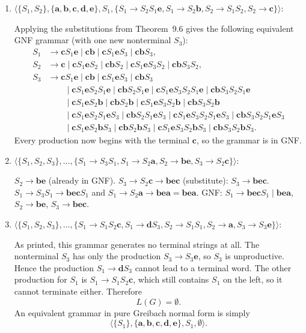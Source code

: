 \begin{enumerate}[{9.}1. ]
\begin{enumerate}
\item $\langle\{S_1,S_2\},\{\pmb{a},\pmb{b},\pmb{c},\pmb{d},\pmb{e}\},S_1,\{S_1\to S_2S_1\pmb{e},S_1\to S_2\pmb{b},S_2\to S_1S_2,S_2\to\pmb{c}\}\rangle$:

Applying the substitutions from Theorem~9.6 gives the following equivalent GNF
grammar (with one new nonterminal $S_3$):
\[
\begin{aligned}
S_1&\to \pmb{c}S_1\pmb{e}\mid \pmb{c}\pmb{b}\mid \pmb{c}S_1\pmb{e}S_3\mid \pmb{c}\pmb{b}S_3,\\
S_2&\to \pmb{c}\mid \pmb{c}S_1\pmb{e}S_2\mid \pmb{c}\pmb{b}S_2\mid
\pmb{c}S_1\pmb{e}S_3S_2\mid \pmb{c}\pmb{b}S_3S_2,\\
S_3&\to \pmb{c}S_1\pmb{e}\mid \pmb{c}\pmb{b}\mid \pmb{c}S_1\pmb{e}S_3\mid
\pmb{c}\pmb{b}S_3\\
&\qquad\mid \pmb{c}S_1\pmb{e}S_2S_1\pmb{e}\mid \pmb{c}\pmb{b}S_2S_1\pmb{e}\mid
\pmb{c}S_1\pmb{e}S_3S_2S_1\pmb{e}\mid \pmb{c}\pmb{b}S_3S_2S_1\pmb{e}\\
&\qquad\mid \pmb{c}S_1\pmb{e}S_2\pmb{b}\mid \pmb{c}\pmb{b}S_2\pmb{b}\mid
\pmb{c}S_1\pmb{e}S_3S_2\pmb{b}\mid \pmb{c}\pmb{b}S_3S_2\pmb{b}\\
&\qquad\mid \pmb{c}S_1\pmb{e}S_2S_1\pmb{e}S_3\mid
\pmb{c}\pmb{b}S_2S_1\pmb{e}S_3\mid
\pmb{c}S_1\pmb{e}S_3S_2S_1\pmb{e}S_3\mid
\pmb{c}\pmb{b}S_3S_2S_1\pmb{e}S_3\\
&\qquad\mid \pmb{c}S_1\pmb{e}S_2\pmb{b}S_3\mid
\pmb{c}\pmb{b}S_2\pmb{b}S_3\mid
\pmb{c}S_1\pmb{e}S_3S_2\pmb{b}S_3\mid
\pmb{c}\pmb{b}S_3S_2\pmb{b}S_3.
\end{aligned}
\]
Every production now begins with the terminal $\pmb{c}$, so the grammar is in
GNF.

\item $\langle\{S_1,S_2,S_3\},\ldots,\{S_1\to S_3S_1, S_1\to S_2\pmb{a},S_2\to\pmb{be},S_3\to S_2\pmb{c}\}\rangle$:

$S_2 \to \pmb{be}$ (already in GNF).
$S_3 \to S_2\pmb{c} \to \pmb{be}\pmb{c}$ (substitute): $S_3 \to \pmb{bec}$.
$S_1 \to S_3 S_1 \to \pmb{bec}S_1$ and $S_1 \to S_2\pmb{a} \to \pmb{be}\pmb{a} = \pmb{bea}$.
GNF: $S_1 \to \pmb{bec}S_1 \mid \pmb{bea}$, $S_2 \to \pmb{be}$, $S_3 \to \pmb{bec}$.

\item $\langle\{S_1,S_2,S_3\},\ldots,\{S_1\to S_1S_2\pmb{c},S_1\to\pmb{d}S_3,S_2\to S_1S_1,S_2\to\pmb{a},S_3\to S_3\pmb{e}\}\rangle$:

As printed, this grammar generates no terminal strings at all.  The nonterminal
$S_3$ has only the production $S_3\to S_3\pmb{e}$, so $S_3$ is unproductive.
Hence the production $S_1\to \pmb{d}S_3$ cannot lead to a terminal word.  The
other production for $S_1$ is $S_1\to S_1S_2\pmb{c}$, which still contains
$S_1$ on the left, so it cannot terminate either.  Therefore
\[
L(G)=\emptyset.
\]
An equivalent grammar in pure Greibach normal form is simply
\[
\langle\{S_1\},\{\pmb{a},\pmb{b},\pmb{c},\pmb{d},\pmb{e}\},S_1,\emptyset\rangle.
\]
\end{enumerate}


\end{enumerate}
